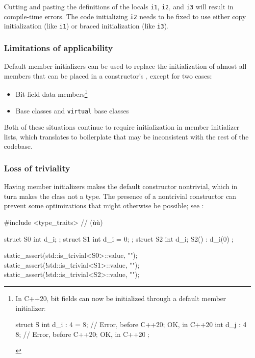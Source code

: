 Cutting and pasting the definitions of the locals \lstinline!i1!,
\lstinline!i2!, and \lstinline!i3! will result in compile-time errors. The
code initializing \lstinline!i2! needs to be fixed to use either copy
initialization (like \lstinline!i1!) or braced initialization (like
\lstinline!i3!).

\subsubsection[Limitations of applicability]{Limitations of applicability}\label{limitations-of-applicability}

Default member initializers can be used to replace the initialization of
almost all members that can be placed in a constructor's , except for two cases:

\begin{itemize}
\item{Bit-field data members\cprotect\footnote{In C++20, bit fields can now be initialized through a default member initializer:
\begin{emcppslisting}[style=footcode]
struct S
{
    int d_i : 4 = 8;  // Error, before C++20; OK, in C++20
    int d_j : 4 {8};  // Error, before C++20; OK, in C++20
};
\end{emcppslisting}
    }}
\item{Base classes and \lstinline!virtual! base classes}
\end{itemize}

Both of these situations continue to require initialization in member
initializer lists, which translates to boilerplate that may be
inconsistent with the rest of the codebase.

\subsubsection[Loss of triviality]{Loss of triviality}\label{loss-of-triviality}

Having member initializers makes the default constructor nontrivial,
which in turn makes the class not a  type.
The presence of a nontrivial constructor can prevent some optimizations
that might otherwise be possible; see :

\begin{emcppslisting}
#include <type_traits>  // (ù{}ù)

struct S0 { int d_i;     };
struct S1 { int d_i = 0; };
struct S2 { int d_i; S2() : d_i(0) { } };

static_assert(std::is_trivial<S0>::value, "");
static_assert(!std::is_trivial<S1>::value, "");
static_assert(!std::is_trivial<S2>::value, "");
\end{emcppslisting}
    

